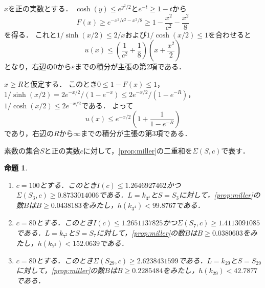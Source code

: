 \documentclass[11pt,a4paper]{ltjsarticle}
\makeatletter
\theoremstyle{ja}
\newtheorem{proposition}[theorem]{命題}
\renewenvironment{proof}[1][証明]{\par
  \pushQED{\qed}\normalfont \topsep6\p@\@plus6\p@\relax
  \trivlist
  \item[\hskip\labelsep\bfseries #1]\hspace{1\zw}\ignorespaces
}{\popQED\endtrivlist\@endpefalse}
\makeatother
\begin{document}
\begin{proof}
$x$を正の実数とする．
$\cosh(y) \le e^{y^2/2}$と$e^{-t} \ge 1 - t$から
\[
F(x) \ge e^{-x^2/c^2 - x^2/8} \ge 1 - \frac{x^2}{c^2} - \frac{x^2}{8}
\]
を得る．
これと$1/\sinh(x/2) \le 2/x$および$1/\cosh(x/2) \le 1$を合わせると
\[
u(x) \le \left( \frac{1}{c^2} + \frac{1}{8} \right) \left( x + \frac{x^2}{2} \right)
\]
となり，右辺の$0$から$\varepsilon$までの積分が主張の第2項である．

$x \ge R$と仮定する．
このとき$0 \le 1 - F(x) \le 1$，$1/\sinh(x/2) = 2e^{-x/2}/(1 - e^{-x}) \le 2e^{-x/2}/(1 - e^{-R})$，$1/\cosh(x/2) \le 2e^{-x/2}$である．
よって
\[
u(x) \le e^{-x/2} \left( 1 + \frac{1}{1 - e^{-R}} \right)
\]
であり，右辺の$R$から$\infty$までの積分が主張の第3項である．
\end{proof}

素数の集合$S$と正の実数$c$に対して，\cref{prop:miller}の二重和を$\Sigma(S, c)$で表す．

\begin{proposition} \label{prop:bound}
\begin{enumerate}
\item $c = 100$とする．このとき$I(c) \le 1.2646927462$かつ$\Sigma(S_3, c) \ge 0.8733014006$である．$L = k_{3^4}$と$S = S_3$に対して，\cref{prop:miller}の数$B$は$B \ge 0.0438183$をみたし，$h(k_{3^4}) < 99.8767$である．
\item $c = 80$とする．このとき$I(c) \le 1.2651137825$かつ$\Sigma(S_7, c) \ge 1.4113091085$である．$L = k_{7^2}$と$S = S_7$に対して，\cref{prop:miller}の数$B$は$B \ge 0.0380603$をみたし，$h(k_{7^2}) < 152.0639$である．
\item $c = 80$とする．このとき$\Sigma(S_{29}, c) \ge 2.6238431599$である．$L = k_{29}$と$S = S_{29}$に対して，\cref{prop:miller}の数$B$は$B \ge 0.2285484$をみたし，$h(k_{29}) < 42.7877$である．
\end{enumerate}
\end{proposition}
\end{document}
